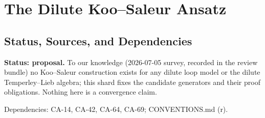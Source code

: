 
\section{The Dilute Koo--Saleur Ansatz}
\label{sec:dilute-koo-saleur-ansatz}

\subsection{Status, Sources, and Dependencies}

\textbf{Status: proposal.}  To our knowledge (2026-07-05 survey, recorded in
the review bundle) no Koo--Saleur construction exists for any dilute loop
model or the dilute Temperley--Lieb algebra; this shard fixes the candidate
generators and their proof obligations.  Nothing here is a convergence claim.

Dependencies: CA-14, CA-42, CA-64, CA-69; CONVENTIONS.md (r).


